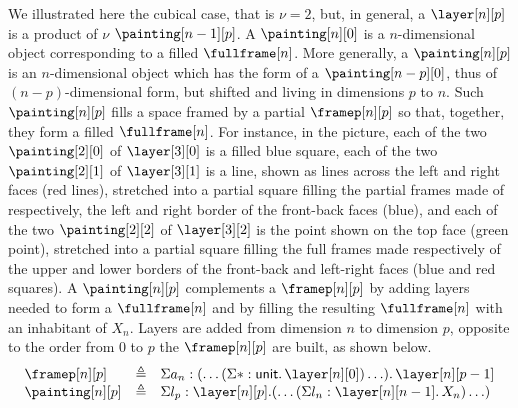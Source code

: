 \documentclass{art.cls/art}
\newcommand{\unittype}{\ensuremath{\mathsf{unit}}}
\newcommand{\unitpoint}{\ensuremath{\ast}}
\newcommand{\defeq}{\ensuremath{\triangleq}}
\begin{document}
We illustrated here the cubical case, that is $\nu = 2$, but, in general, a $\layer[n][p]$ is a product of $\nu$ $\painting[n - 1][p]$. A $\painting[n][0]$ is a $n$-dimensional object corresponding to a filled $\fullframe[n]$. More generally, a $\painting[n][p]$ is an $n$-dimensional object which has the form of a $\painting[n-p][0]$, thus of $(n-p)$-dimensional form, but shifted and living in dimensions $p$ to $n$. Such $\painting[n][p]$ fills a space framed by a partial $\framep[n][p]$ so that, together, they form a filled $\fullframe[n]$. For instance, in the picture, each of the two $\painting[2][0]$ of $\layer[3][0]$ is a filled blue square, each of the two $\painting[2][1]$ of $\layer[3][1]$ is a line, shown as lines across the left and right faces (red lines), stretched into a partial square filling the partial frames made of respectively, the left and right border of the front-back faces (blue), and each of the two $\painting[2][2]$ of $\layer[3][2]$ is the point shown on the top face (green point), stretched into a partial square filling the full frames made respectively of the upper and lower borders of the front-back and left-right faces (blue and red squares). A $\painting[n][p]$ complements a $\framep[n][p]$ by adding layers needed to form a $\fullframe[n]$ and by filling the resulting $\fullframe[n]$ with an inhabitant of $X_n$. Layers are added from dimension $n$ to dimension $p$, opposite to the order from $0$ to $p$ the $\framep[n][p]$ are built, as shown below.
\begin{equation*}
  \begin{array}{lll}
    \framep[n][p]   & \defeq & \Sigma a_n: (\ldots (\Sigma \unitpoint: \unittype .\, \layer[n][0]) \ldots) .\, \layer[n][p - 1] \\
    \painting[n][p] & \defeq & \Sigma l_p: \layer[n][p]. (\ldots (\Sigma l_n: \layer[n][n - 1] .\, X_n) \ldots)
  \end{array}
\end{equation*}
\end{document}
